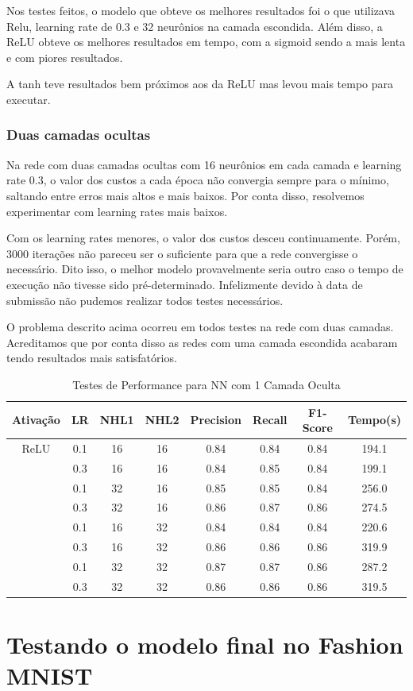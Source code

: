 \documentclass[conference]{IEEEtran}
\begin{document}
	Nos testes feitos, o modelo que obteve os melhores resultados foi o que utilizava Relu, learning rate de 0.3 e 32 neurônios na camada escondida. Além disso, a ReLU obteve os melhores resultados em tempo, com a sigmoid sendo a mais lenta e com piores resultados.
	
	A tanh teve resultados bem próximos aos da ReLU mas levou mais tempo para executar.

\subsubsection{Duas camadas ocultas}

	Na rede com duas camadas ocultas com 16 neurônios em cada camada e learning rate 0.3, o valor dos custos a cada época não convergia sempre para o mínimo, saltando entre erros mais altos e mais baixos. Por conta disso, resolvemos experimentar com learning rates mais baixos.
	
	Com os learning rates menores, o valor dos custos desceu continuamente. Porém, 3000 iterações não pareceu ser o suficiente para que a rede convergisse o necessário. Dito isso, o melhor modelo provavelmente seria outro caso o tempo de execução não tivesse sido pré-determinado. Infelizmente devido à data de submissão não pudemos realizar todos testes necessários.
	
	O problema descrito acima ocorreu em todos testes na rede com duas camadas. Acreditamos que por conta disso as redes com uma camada escondida acabaram tendo resultados mais satisfatórios.

\begin{table}[h!]
 \begin{center}
  \caption{Testes de Performance para NN com 1 Camada Oculta}
  \label{table:table1}
  \begin{tabular}{ |c|c|c|c|c|c|c|c| }
   \hline
   Ativação & LR & NHL1 & NHL2 & Precision & Recall & F1-Score & Tempo(s)\\
   \hline
   ReLU & 0.1 & 16 & 16 & 0.84 & 0.84 & 0.84 & 194.1 \\
        & 0.3 & 16 & 16 & 0.84 & 0.85 & 0.84 & 199.1 \\
        & 0.1 & 32 & 16 & 0.85 & 0.85 & 0.84 & 256.0 \\
        & 0.3 & 32 & 16 & 0.86 & 0.87 & 0.86 & 274.5 \\
        & 0.1 & 16 & 32 & 0.84 & 0.84 & 0.84 & 220.6 \\
        & 0.3 & 16 & 32 & 0.86 & 0.86 & 0.86 & 319.9 \\
        & 0.1 & 32 & 32 & 0.87 & 0.87 & 0.86 & 287.2 \\
        & 0.3 & 32 & 32 & 0.86 & 0.86 & 0.86 & 319.5 \\

 \hline
 \end{tabular}
 \end{center}
\end{table}
	
\section{Testando o modelo final no Fashion MNIST}

\printbibliography
\end{document}
